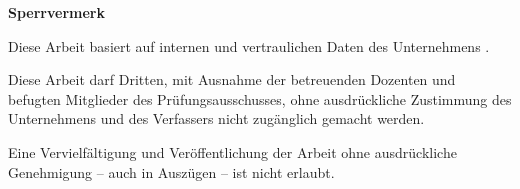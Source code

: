 


%
{%
\vspace{11cm}
\color{red}\textsf{\large\textbf{Sperrvermerk}}

Diese Arbeit basiert auf internen und vertraulichen Daten des Unternehmens \hsmafirma.

Diese Arbeit darf Dritten, mit Ausnahme der betreuenden Dozenten und befugten Mitglieder des Prüfungsausschusses, ohne ausdrückliche Zustimmung des Unternehmens und des Verfassers nicht zugänglich gemacht werden.

Eine Vervielfältigung und Veröffentlichung der Arbeit ohne ausdrückliche Genehmigung -- auch in Auszügen -- ist nicht erlaubt.
\color{black}
}{}

\cleardoublepage



